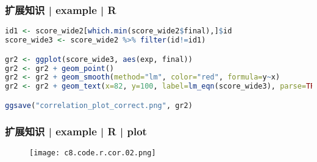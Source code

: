 \begin{frame}[fragile]
  \frametitle{扩展知识 | example | R}
\begin{lstlisting}[language=r]
id1 <- score_wide2[which.min(score_wide2$final),]$id
score_wide3 <- score_wide2 %>% filter(id!=id1)

gr2 <- ggplot(score_wide3, aes(exp, final))
gr2 <- gr2 + geom_point()
gr2 <- gr2 + geom_smooth(method="lm", color="red", formula=y~x)
gr2 <- gr2 + geom_text(x=82, y=100, label=lm_eqn(score_wide3), parse=TRUE, size=5, color="blue")

ggsave("correlation_plot_correct.png", gr2)
\end{lstlisting}
\end{frame}

\begin{frame}
  \frametitle{扩展知识 | example | R | plot}
  \begin{figure}
    \centering
    \texttt{[image: c8.code.r.cor.02.png]}
  \end{figure}
\end{frame}



